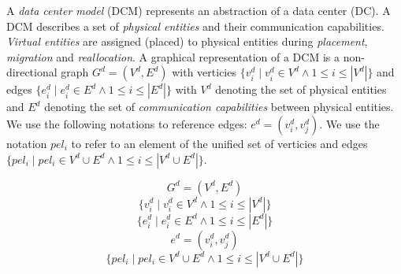 \documentclass[conference]{IEEEtran}
\begin{document}
A \textit{data center model} (DCM) represents an abstraction of a data center (DC). A DCM describes a set of \textit{physical entities} and their communication capabilities. \textit{Virtual entities} are assigned (placed) to physical entities during \textit{placement}, \textit{migration} and \textit{reallocation}.
A graphical representation of a DCM is a non-directional graph $G^{d}=(V^{d},E^{d})$ with verticies $\{ v^{d}_i \mid v^{d}_i \in V^{d} \wedge 1 \leq i \leq \left\vert V^{d} \right\vert \}$ and edges $\{ e^{d}_i \mid e^{d}_i \in E^{d} \wedge 1 \leq i \leq \left\vert E^{d} \right\vert \}$ with $V^{d}$ denoting the set of physical entities and $E^{d}$ denoting the set of \textit{communication capabilities} between physical entities.
We use the following notations to reference edges: $e^{d}=(v^{d}_i, v^{d}_j)$.
We use the notation $pel_i$ to refer to an element of the unified set of verticies and edges $\{ pel_i \mid pel_i \in V^{d} \cup E^{d} \wedge 1 \leq i \leq \left\vert V^{d} \cup E^{d} \right\vert \}$.

\begin{equation}
G^{d}=(V^{d},E^{d})
\end{equation}
\begin{equation}
\{ v^{d}_i \mid v^{d}_i \in V^{d} \wedge 1 \leq i \leq \left\vert V^{d} \right\vert \}
\end{equation}
\begin{equation}
\{ e^{d}_i \mid e^{d}_i \in E^{d} \wedge 1 \leq i \leq \left\vert E^{d} \right\vert \}
\end{equation}
\begin{equation}
e^{d}=(v^{d}_i, v^{d}_j)
\end{equation}
\begin{equation}
\{ pel_i \mid pel_i \in V^{d} \cup E^{d} \wedge 1 \leq i \leq \left\vert V^{d} \cup E^{d} \right\vert \}
\end{equation}
\end{document}
